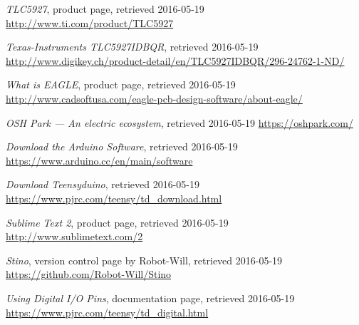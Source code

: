 \documentclass[a4paper, 11pt, titlepage]{report}
\begin{document}
\begin{thebibliography}{99}
\emph{TLC5927}, product page, retrieved 2016-05-19
\newline \url{http://www.ti.com/product/TLC5927}

\emph{Texas-Instruments TLC5927IDBQR}, retrieved 2016-05-19
\newline \url{http://www.digikey.ch/product-detail/en/TLC5927IDBQR/296-24762-1-ND/}

\emph{What is EAGLE}, product page, retrieved 2016-05-19
\newline \url{http://www.cadsoftusa.com/eagle-pcb-design-software/about-eagle/}

\emph{OSH Park --- An electric ecosystem}, retrieved 2016-05-19
\newline \url{https://oshpark.com/}

\emph{Download the Arduino Software}, retrieved 2016-05-19
\newline \url{https://www.arduino.cc/en/main/software}

\emph{Download Teensyduino}, retrieved 2016-05-19
\newline \url{https://www.pjrc.com/teensy/td\_download.html}

\emph{Sublime Text 2}, product page, retrieved 2016-05-19
\newline \url{http://www.sublimetext.com/2}

\emph{Stino}, version control page by Robot-Will, retrieved 2016-05-19
\newline \url{https://github.com/Robot-Will/Stino}




\emph{Using Digital I/O Pins}, documentation page, retrieved 2016-05-19
\newline \url{https://www.pjrc.com/teensy/td\_digital.html}


\end{thebibliography}
\end{document}
